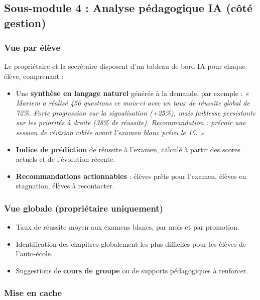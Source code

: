 \documentclass[12pt,a4paper]{article}
\begin{document}
\subsection{Sous-module 4 : Analyse pédagogique IA (côté gestion)}

\subsubsection{Vue par élève}

Le propriétaire et la secrétaire disposent d'un tableau de bord IA pour chaque élève, comprenant :

\begin{itemize}[leftmargin=*,itemsep=4pt]
    \item Une \textbf{synthèse en langage naturel} générée à la demande, par exemple : \textit{« Mariem a réalisé 450 questions ce mois-ci avec un taux de réussite global de 72\%. Forte progression sur la signalisation (+25\%), mais faiblesse persistante sur les priorités à droite (38\% de réussite). Recommandation : prévoir une session de révision ciblée avant l'examen blanc prévu le 15. »}
    \item \textbf{Indice de prédiction} de réussite à l'examen, calculé à partir des scores actuels et de l'évolution récente.
    \item \textbf{Recommandations actionnables} : élèves prêts pour l'examen, élèves en stagnation, élèves à recontacter.
\end{itemize}

\subsubsection{Vue globale (propriétaire uniquement)}

\begin{itemize}[leftmargin=*,itemsep=4pt]
    \item Taux de réussite moyen aux examens blancs, par mois et par promotion.
    \item Identification des chapitres globalement les plus difficiles pour les élèves de l'auto-école.
    \item Suggestions de \textbf{cours de groupe} ou de supports pédagogiques à renforcer.
\end{itemize}

\subsubsection{Mise en cache}
\end{document}
